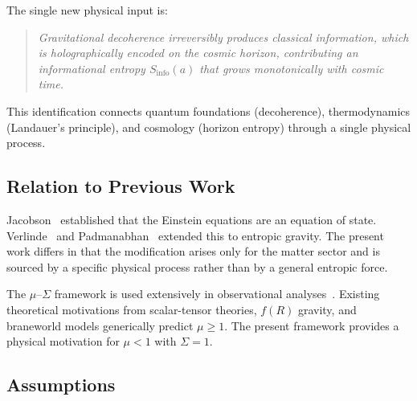 \documentclass[11pt]{article}
\begin{document}
The single new physical input is:
\begin{quote}
\textit{Gravitational decoherence irreversibly produces classical
information, which is holographically encoded on the cosmic horizon,
contributing an informational entropy $S_\mathrm{info}(a)$ that grows
monotonically with cosmic time.}
\end{quote}
This identification connects quantum foundations (decoherence),
thermodynamics (Landauer's principle), and cosmology (horizon entropy)
through a single physical process.

\subsection{Relation to Previous Work}

Jacobson~\citep{Jacobson1995} established that the Einstein equations are
an equation of state.  Verlinde~\citep{Verlinde2011} and
Padmanabhan~\citep{Padmanabhan2010} extended this to entropic gravity.
The present work differs in that the modification arises only for the
matter sector and is sourced by a specific physical process rather than by
a general entropic force.

The $\mu$--$\Sigma$ framework is used extensively in observational
analyses~\citep{PogosianSilvestri2016,Abbott2023,Andrade2024,DESIDR1}.
Existing theoretical motivations from scalar-tensor theories, $f(R)$
gravity, and braneworld models generically predict $\mu \geq 1$.  The
present framework provides a physical motivation for $\mu < 1$ with
$\Sigma = 1$.

\subsection{Assumptions}
\end{document}
